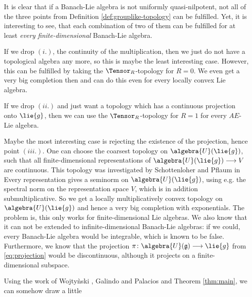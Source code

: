 \documentclass[
11pt,                          %
english                        %
]{article}
\begin{document}
\begin{remark}
	It is clear that if a Banach-Lie algebra is not uniformly quasi-nilpotent,
	not all of the three points from Definition \ref{def:grouplike-topology} can be
	fulfilled. Yet, it is interesting to see, that each combination of two of them
	can be fulfilled for at least \emph{every finite-dimensional} Banach-Lie 
	algebra.
	\begin{remarklist}
		\item
		If we drop $(i.)$, the continuity of the multiplication, then we just do not
		have a topological algebra any more, so this is maybe the least interesting
		case. However, this can be fulfilled by taking the $\Tensor_R$-topology for 
		$R = 0$. We even get a very big completion then and can do this even for
		every locally convex Lie algebra.
		
		\item
		If we drop $(ii.)$ and just want a topology which has a continuous 
		projection onto $\lie{g}$, then we can use the $\Tensor_R$-topology for 
		$R = 1$ for every $AE$-Lie algebra.

		\item
		Maybe the most interesting case is rejecting the existence of the 
		projection, hence point $(iii.)$. One can choose 
		the coarsest topology on $\algebra{U}(\lie{g})$, such that all 
		finite-dimensional representations of $\algebra{U}(\lie{g}) 
		\longrightarrow V$ are continuous. This topology was investigated by
		Schottenloher and Pflaum in \cite{pflaum.schottenloher:1998a}
		Every representation gives a seminorm on $\algebra{U}(\lie{g})$, using e.g.
		the spectral norm on the representation space $V$, which is in addition
		submultiplicative. So we get a locally multiplicatively convex topology
		on $\algebra{U}(\lie{g})$ and hence a very big completion with exponentials.
		The problem is, this only works for finite-dimensional Lie algebras. We also 
		know that it can not be extended to infinite-dimensional Banach-Lie 
		algebras: if we could, every Banach-Lie algebra would be integrable, which 
		is known to be false. Furthermore, we know that the projection $\pi \colon
		\algebra{U}(\mathfrak{g}) \longrightarrow \lie{g}$ from
		\eqref{eq:projection} would be discontinuous, although it projects on a
		finite-dimensional subspace.
	\end{remarklist}
\end{remark}
Using the work of Wojty\`nski \cite{wojtynski:1998a}, Galindo and Palacios 
\cite{galindo.palacios:} and Theorem \ref{thm:main}, we can somehow draw a little 
\end{document}
